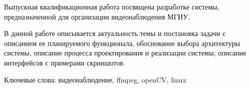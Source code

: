 Выпускная квалификационная работа посвящена разработке системы,
предназначенной для организации видеонаблюдения МГИУ.

В данной работе описывается актуальность темы и
постановка задачи с описанием ее планируемого функционала,
обоснование выбора архитектуры системы, описание процесса
проектирования и реализации системы, описание интерфейсов
с примерами скриншотов.

Ключевые слова: видеонаблюдение, ffmpeg, openCV, linux
\newpage
